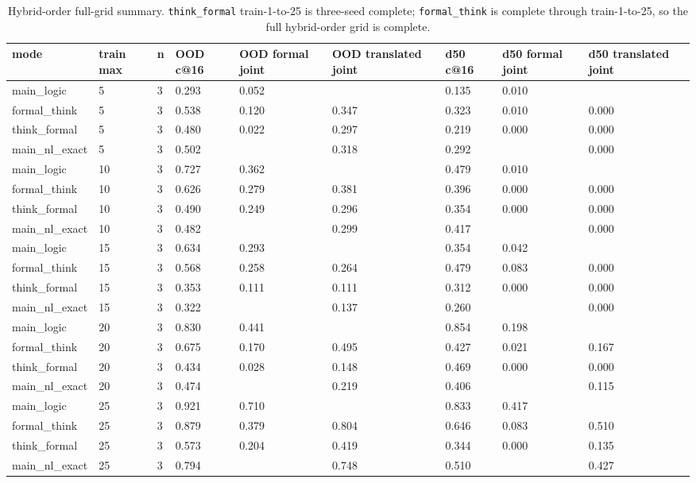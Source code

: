 \documentclass[10pt]{article}
\begin{document}
\begin{table}[H]
\centering
\scriptsize
\begin{tabular}{lllllllll}
\toprule
mode & train max & n & OOD c@16 & OOD formal joint & OOD translated joint & d50 c@16 & d50 formal joint & d50 translated joint \\
\midrule
main\_logic & 5 & 3 & 0.293 & 0.052 &  & 0.135 & 0.010 &  \\
formal\_think & 5 & 3 & 0.538 & 0.120 & 0.347 & 0.323 & 0.010 & 0.000 \\
think\_formal & 5 & 3 & 0.480 & 0.022 & 0.297 & 0.219 & 0.000 & 0.000 \\
main\_nl\_exact & 5 & 3 & 0.502 &  & 0.318 & 0.292 &  & 0.000 \\
main\_logic & 10 & 3 & 0.727 & 0.362 &  & 0.479 & 0.010 &  \\
formal\_think & 10 & 3 & 0.626 & 0.279 & 0.381 & 0.396 & 0.000 & 0.000 \\
think\_formal & 10 & 3 & 0.490 & 0.249 & 0.296 & 0.354 & 0.000 & 0.000 \\
main\_nl\_exact & 10 & 3 & 0.482 &  & 0.299 & 0.417 &  & 0.000 \\
main\_logic & 15 & 3 & 0.634 & 0.293 &  & 0.354 & 0.042 &  \\
formal\_think & 15 & 3 & 0.568 & 0.258 & 0.264 & 0.479 & 0.083 & 0.000 \\
think\_formal & 15 & 3 & 0.353 & 0.111 & 0.111 & 0.312 & 0.000 & 0.000 \\
main\_nl\_exact & 15 & 3 & 0.322 &  & 0.137 & 0.260 &  & 0.000 \\
main\_logic & 20 & 3 & 0.830 & 0.441 &  & 0.854 & 0.198 &  \\
formal\_think & 20 & 3 & 0.675 & 0.170 & 0.495 & 0.427 & 0.021 & 0.167 \\
think\_formal & 20 & 3 & 0.434 & 0.028 & 0.148 & 0.469 & 0.000 & 0.000 \\
main\_nl\_exact & 20 & 3 & 0.474 &  & 0.219 & 0.406 &  & 0.115 \\
main\_logic & 25 & 3 & 0.921 & 0.710 &  & 0.833 & 0.417 &  \\
formal\_think & 25 & 3 & 0.879 & 0.379 & 0.804 & 0.646 & 0.083 & 0.510 \\
think\_formal & 25 & 3 & 0.573 & 0.204 & 0.419 & 0.344 & 0.000 & 0.135 \\
main\_nl\_exact & 25 & 3 & 0.794 &  & 0.748 & 0.510 &  & 0.427 \\
\bottomrule
\end{tabular}
\caption{Hybrid-order full-grid summary. \texttt{think\_formal} train-1-to-25 is three-seed complete; \texttt{formal\_think} is complete through train-1-to-25, so the full hybrid-order grid is complete.}
\end{table}
\end{document}
